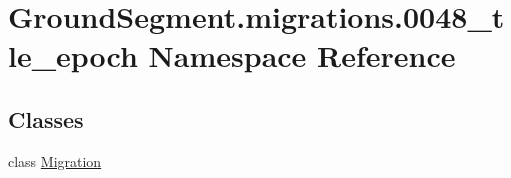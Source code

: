 \hypertarget{namespace_ground_segment_1_1migrations_1_10048__tle__epoch}{}\section{Ground\+Segment.\+migrations.0048\+\_\+tle\+\_\+epoch Namespace Reference}
\label{namespace_ground_segment_1_1migrations_1_10048__tle__epoch}
\subsection*{Classes}
\begin{DoxyCompactItemize}
\item 
class \hyperlink{class_ground_segment_1_1migrations_1_10048__tle__epoch_1_1_migration}{Migration}
\end{DoxyCompactItemize}
